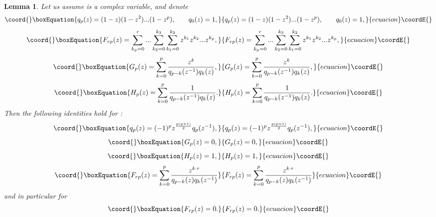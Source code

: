\documentclass[a4paper,a4paper]{article}
\newtheorem{lemma}[theorem]{Lemma}
\begin{document}
\begin{lemma}
Let us assume \coordHE{} is a complex variable, \coordHE{} and denote 
\begin{equation}\coord{}\boxEquation{
q_{p}(z)=(1-z)(1-z^{2})...(1-z^{p}),\qquad q_{0}(z)=1,  \label{ga11}
}{
q_{p}(z)=(1-z)(1-z^{2})...(1-z^{p}),\qquad q_{0}(z)=1,  }{ecuacion}\coordE{}\end{equation}%
\begin{equation}\coord{}\boxEquation{
F_{rp}(z)=\sum_{k_{p}=0}^{r}...\sum_{k_{2}=0}^{k_{3}}
\sum_{k_{1}=0}^{k_{2}}z^{k_{1}}z^{k_{2}}...z^{k_{p}},  \label{gaa11}
}{
F_{rp}(z)=\sum_{k_{p}=0}^{r}...\sum_{k_{2}=0}^{k_{3}}
\sum_{k_{1}=0}^{k_{2}}z^{k_{1}}z^{k_{2}}...z^{k_{p}},  }{ecuacion}\coordE{}\end{equation}%
\begin{equation}\coord{}\boxEquation{
G_{p}(z)=\sum_{k=0}^{p}\frac{z^{k}}{q_{p-k}(z^{-1})q_{k}(z)},  \label{ga12}
}{
G_{p}(z)=\sum_{k=0}^{p}\frac{z^{k}}{q_{p-k}(z^{-1})q_{k}(z)},  }{ecuacion}\coordE{}\end{equation}%
\begin{equation}\coord{}\boxEquation{
H_{p}(z)=\sum_{k=0}^{p}\frac{1}{q_{p-k}(z^{-1})q_{k}(z)}.  \label{ga13}
}{
H_{p}(z)=\sum_{k=0}^{p}\frac{1}{q_{p-k}(z^{-1})q_{k}(z)}.  }{ecuacion}\coordE{}\end{equation}%
Then the following identities hold for \coordHE{}%
: 
\begin{equation}\coord{}\boxEquation{
q_{p}(z)=(-1)^{p}z^{\frac{p(p+1)}{2}}q_{p}(z^{-1}),  \label{ga14}
}{
q_{p}(z)=(-1)^{p}z^{\frac{p(p+1)}{2}}q_{p}(z^{-1}),  }{ecuacion}\coordE{}\end{equation}%
\begin{equation}\coord{}\boxEquation{
G_{p}(z)=0,  \label{ga15}
}{
G_{p}(z)=0,  }{ecuacion}\coordE{}\end{equation}%
\begin{equation}\coord{}\boxEquation{
H_{p}(z)=1,  \label{ga16}
}{
H_{p}(z)=1,  }{ecuacion}\coordE{}\end{equation}%
\begin{equation}\coord{}\boxEquation{
F_{rp}(z)=\sum_{k=0}^{p}\frac{z^{k\cdot r}}{q_{p-k}(z)q_{k}(z^{-1})}
\label{gaa16}
}{
F_{rp}(z)=\sum_{k=0}^{p}\frac{z^{k\cdot r}}{q_{p-k}(z)q_{k}(z^{-1})}
}{ecuacion}\coordE{}\end{equation}%
and in particular for \coordHE{}%
\begin{equation}\coord{}\boxEquation{
F_{rp}(z)=0.  \label{gab16}
}{
F_{rp}(z)=0.  }{ecuacion}\coordE{}\end{equation}
\end{lemma}
\end{document}
